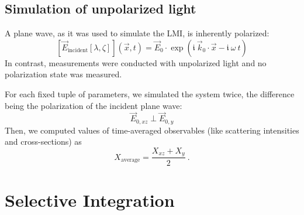 \documentclass[10pt]{article}
\begin{document}




\subsection*{Simulation of unpolarized light}

A plane wave, as it was used to simulate the LMI, is inherently polarized: 
$$
    \left[ \vec{E}_\mathrm{incident} \left[ \lambda, \zeta \right] \right] (\vec{x}, t) = \vec{E}_0 \cdot \exp\!\left( \mathfrak{i}\ \vec{k}_0\cdot\vec{x} - \mathfrak{i}\ \omega\ t \right)
$$
In contrast, measurements were conducted with unpolarized light and no polarization state was measured. 


For each fixed tuple of parameters, we simulated the system twice, the difference being the polarization of the incident plane wave: 
$$ \vec{E}_{0,xz} \perp \vec{E}_{0,y} $$
Then, we computed values of time-averaged observables (like scattering intensities and cross-sections) as 
$$ X_\mathrm{average} = \frac{ X_{xz} + X_{y} }{2} \ . $$ 






\section*{Selective Integration}

\end{document}
